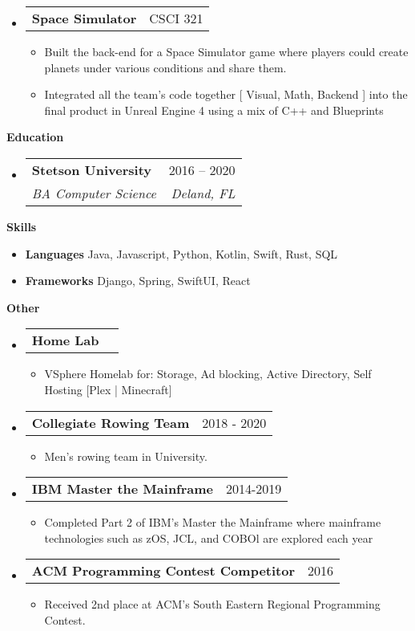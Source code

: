 \documentclass[letterpaper,12pt]{article}[leftmargin=*]
\makeatletter
\def \entryspacing {-0pt}
\renewcommand{\section}[2]{\vspace{5pt}
  \colorbox{secondary}{\color{white}\raggedbottom\normalsize\textbf{{#1}{\hspace{7pt}#2}}}
}
\newcommand{\resumeEntryStart}{\begin{itemize}[leftmargin=2.5mm]}
\newcommand{\resumeEntryEnd}{\end{itemize}\vspace{\entryspacing}}
\newcommand{\resumeItemListStart}{\begin{itemize}[leftmargin=4.5mm]}
\newcommand{\resumeItemListEnd}{\end{itemize}}
\newcommand{\resumeItem}[1]{
  \item\small{
    {#1 \vspace{-2pt}}
  }
}
\newcommand{\resumeEntryTSDL}[4]{
  \vspace{-1pt}\item[]
    \begin{tabularx}{0.97\textwidth}{X@{\hspace{60pt}}r}
      \textbf{\color{primary}#1} & {\firabook\color{accent}\small#2} \\
      \textit{\color{accent}\small#3} & \textit{\color{accent}\small#4} \\
    \end{tabularx}\vspace{-6pt}
}
\newcommand{\resumeEntryTD}[2]{
  \vspace{-1pt}\item[]
    \begin{tabularx}{0.97\textwidth}{X@{\hspace{60pt}}r}
      \textbf{\color{primary}#1} & {\firabook\color{accent}\small#2} \\
    \end{tabularx}\vspace{-6pt}
}
\newcommand{\resumeEntryS}[2]{
  \item[]\small{
    \textbf{\color{primary}#1 }{ #2 \vspace{-6pt}}
  }
}
\makeatother
\begin{document}
  \resumeEntryStart
    \resumeEntryTD
      {Space Simulator}{CSCI 321}
    \resumeItemListStart
    \resumeItem {Built the back-end for a Space Simulator game where players
    could create planets under various conditions and share them.}
      \resumeItem {Integrated all the team's code together [ Visual, Math, Backend ] into the final product in Unreal Engine 4 using a mix of C++ and Blueprints}
    \resumeItemListEnd
  \resumeEntryEnd

\section{\faGraduationCap}{Education}

  \resumeEntryStart
    \resumeEntryTSDL
      {Stetson University}{2016 -- 2020}
      {BA Computer Science}{Deland, FL}
  \resumeEntryEnd

\section{\faGears}{Skills}
 \resumeEntryStart
  \resumeEntryS{Languages } {Java, Javascript, Python, Kotlin, Swift, Rust, SQL}
  \resumeEntryS{Frameworks } {Django, Spring, SwiftUI, React}
 \resumeEntryEnd
 
 \section{\faGears}{Other}
 \resumeEntryStart
    \resumeEntryTD
      {Home Lab}{}
    \resumeItemListStart
    \resumeItem {VSphere Homelab for: Storage, Ad blocking, Active Directory,
    Self Hosting [Plex | Minecraft]}
    \resumeItemListEnd
  \resumeEntryEnd
 \resumeEntryStart
    \resumeEntryTD
      {Collegiate Rowing Team}{2018 - 2020}
    \resumeItemListStart
      \resumeItem {Men's rowing team in University.}
    \resumeItemListEnd
  \resumeEntryEnd
   \resumeEntryStart
    \resumeEntryTD
      {IBM Master the Mainframe}{2014-2019}
    \resumeItemListStart
    \resumeItem {Completed Part 2 of IBM's Master the Mainframe where mainframe
    technologies such as zOS, JCL, and COBOl are explored each year}
    \resumeItemListEnd
  \resumeEntryEnd
  \resumeEntryStart
    \resumeEntryTD
      {ACM Programming Contest Competitor}{2016}
    \resumeItemListStart
      \resumeItem {Received 2nd place at ACM's South Eastern Regional Programming Contest.}
    \resumeItemListEnd
  \resumeEntryEnd
\end{document}
